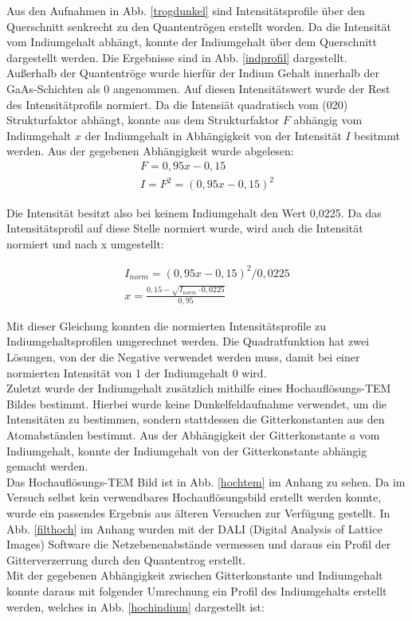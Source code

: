 \documentclass[a4paper,11pt,DIV=11]{scrartcl}
\begin{document}
Aus den Aufnahmen in Abb. \ref{trogdunkel} sind Intensitätsprofile über den Querschnitt senkrecht zu den Quantentrögen erstellt worden. Da die Intensität vom Indiumgehalt abhängt, konnte der Indiumgehalt über dem Querschnitt dargestellt werden. Die Ergebnisse sind in Abb. \ref{indprofil} dargestellt. \\
Außerhalb der Quantentröge wurde hierfür der Indium Gehalt innerhalb der GaAs-Schichten als 0 angenommen. Auf diesen Intensitätswert wurde der Rest des Intensitätprofils normiert. Da die Intensiät quadratisch vom (020) Strukturfaktor abhängt, konnte aus dem Strukturfaktor $F$ abhängig vom Indiumgehalt $x$ der Indiumgehalt in Abhängigkeit von der Intensität $I$ besitmmt werden. Aus der gegebenen Abhängigkeit wurde abgelesen:
\begin{align*}
	F = 0,95x - 0,15 \\
	I = F^2 = (0,95x - 0,15)^2 
\end{align*}

Die Intensität besitzt also bei keinem Indiumgehalt den Wert 0,0225. Da das Intensitätsprofil auf diese Stelle normiert wurde, wird auch die Intensität normiert und nach x umgestellt:

\begin{align*}
	I_{norm} = (0,95x - 0,15)^2 / 0,0225 \\
	x = \frac{0,15-\sqrt{I_{norm}\cdot 0,0225}}{0,95}
\end{align*}

Mit dieser Gleichung konnten die normierten Intensitätsprofile zu Indiumgehaltsprofilen umgerechnet werden. Die Quadratfunktion hat zwei Lösungen, von der die Negative verwendet werden muss, damit bei einer normierten Intensität von 1 der Indiumgehalt 0 wird. \\
Zuletzt wurde der Indiumgehalt zusätzlich mithilfe eines Hochauflösungs-TEM Bildes bestimmt. Hierbei wurde keine Dunkelfeldaufnahme verwendet, um die Intensitäten zu bestimmen, sondern stattdessen die Gitterkonstanten aus den Atomabständen bestimmt. Aus der Abhängigkeit der Gitterkonstante $a$ vom Indiumgehalt, konnte der Indiumgehalt von der Gitterkonstante abhängig gemacht werden. \\
Das Hochauflösungs-TEM Bild ist in Abb. \ref{hochtem} im Anhang zu sehen. Da im Versuch selbst kein verwendbares Hochauflösungsbild erstellt werden konnte, wurde ein passendes Ergebnis aus älteren Versuchen zur Verfügung gestellt. In Abb. \ref{filthoch} im Anhang wurden mit der DALI (Digital Analysis of Lattice Images) Software die Netzebenenabstände vermessen und daraus ein Profil der Gitterverzerrung durch den Quantentrog erstellt. \\
Mit der gegebenen Abhängigkeit zwischen Gitterkonstante und Indiumgehalt konnte daraus mit folgender Umrechnung ein Profil des Indiumgehalts erstellt werden, welches in Abb. \ref{hochindium} dargestellt ist:
\end{document}
